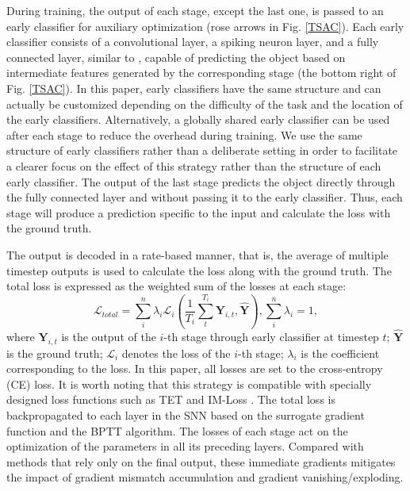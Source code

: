 \documentclass[letterpaper]{article} %
\begin{document}
During training, the output of each stage, except the last one, is passed to an early classifier for auxiliary optimization (rose arrows in Fig. \ref{TSAC}). Each early classifier consists of a convolutional layer, a spiking neuron layer, and a fully connected layer, similar to \cite{BranchyNet}, capable of predicting the object based on intermediate features generated by the corresponding stage (the bottom right of Fig. \ref{TSAC}). In this paper, early classifiers have the same structure and can actually be customized depending on the difficulty of the task and the location of the early classifiers. Alternatively, a globally shared early classifier can be used after each stage to reduce the overhead during training. We use the same structure of early classifiers rather than a deliberate setting in order to facilitate a clearer focus on the effect of this strategy rather than the structure of each early classifier. The output of the last stage predicts the object directly through the fully connected layer and without passing it to the early classifier. Thus, each stage will produce a prediction specific to the input and calculate the loss with the ground truth.

The output is decoded in a rate-based manner, that is, the average of multiple timestep outputs is used to calculate the loss along with the ground truth. The total loss is expressed as the weighted sum of the losses at each stage:
\begin{equation}
\mathcal{L}_{total}=\sum_i^n {\lambda_i \mathcal{L}_i(\frac{1}{T_i}\sum_t^{T_i} {\boldsymbol{Y}_{i,t},\hat{\boldsymbol{Y}}})},
\sum_i^n \lambda_i = 1,
\label{eq14}
\end{equation}
where $\boldsymbol{Y}_{i,t}$ is the output of the $i$-th stage through early classifier at timestep $t$; $\hat{\boldsymbol{Y}}$ is the ground truth; $\mathcal{L}_i$ denotes the loss of the $i$-th stage; $\lambda_i$ is the coefficient corresponding to the loss. In this paper, all losses are set to the cross-entropy (CE) loss. It is worth noting that this strategy is compatible with specially designed loss functions such as TET \cite{TET} and IM-Loss \cite{NEURIPS2022_010c5ba0}. The total loss is backpropagated to each layer in the SNN based on the surrogate gradient function and the BPTT algorithm.
The losses of each stage act on the optimization of the parameters in all its preceding layers. Compared with methods that rely only on the final output, these immediate gradients mitigates the impact of gradient mismatch accumulation and gradient vanishing/exploding.
\end{document}

